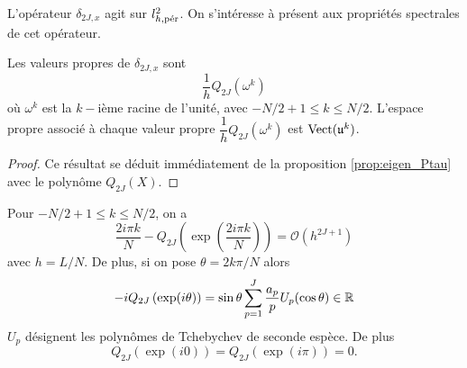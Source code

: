 L'opérateur $\delta_{2J,x}$ agit sur $l^2_{h,\per}$. On s'intéresse à présent aux propriétés spectrales de cet opérateur.
\begin{proposition}
Les valeurs propres de $\delta_{2J,x}$ sont
\begin{equation}
\dfrac{1}{h}Q_{2J}(\omega^k)
\end{equation}
où $\omega^k$ est la $k-$ième racine de l'unité, avec $-N/2+1 \leq k \leq N/2$. L'espace propre associé à chaque valeur propre $\dfrac{1}{h}Q_{2J}(\omega^k)$ est $\Vect ( \mathfrak{u}^k )$.
\label{prop:delta_x_spectre}
\end{proposition}

\begin{proof}
Ce résultat se déduit immédiatement de la proposition \ref{prop:eigen_Ptau} avec le polynôme $Q_{2J}(X)$.
\end{proof}

\begin{proposition}
Pour $-N/2+1 \leq k \leq N/2$, on a 
\begin{equation}
\dfrac{2 i \pi k}{N} - Q_{2J} \left( \exp \left( \dfrac{2 i \pi k}{N} \right) \right) = \mathcal{O}(h^{2J+1})
\end{equation}
avec $h=L/N$.
De plus, si on pose $\theta= 2 k \pi / N$ alors 
\begin{equation}
-i Q_{2J} \left( \exp ( i \theta ) \right) = \sin \theta \gsum_{p=1}^J \dfrac{a_p}{p} U_p (\cos \theta)\in \mathbb{R}
\end{equation}
$U_p$ désignent les polynômes de Tchebychev de seconde espèce. De plus 
\begin{equation}
Q_{2J} \left( \exp ( i 0 ) \right) = Q_{2J} \left( \exp ( i \pi ) \right) = 0.
\end{equation}
\label{prop:freq_pol_classique1}
\end{proposition}

